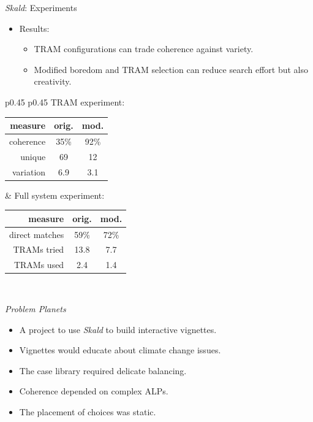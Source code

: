 \documentclass[xcolor=x11names]{beamer}
\def\skald/{\textit{Skald}}
\def\problemplanets/{\textit{Problem Planets}}
\begin{document}
\begin{frame}{\skald/: Experiments}
  \begin{itemize}\addtolength{\itemsep}{0.5\baselineskip}
    \item Results:
    \begin{itemize}\addtolength{\itemsep}{0.5\baselineskip}
      \vspace{0.5\baselineskip}
      \item TRAM configurations can trade coherence against variety.
      \item Modified boredom and TRAM selection can reduce search effort but also creativity.
    \end{itemize}
  \end{itemize}
  \vspace{1ex}
  \begin{tabular}{p{} p{}}
  \scriptsize
  \centering
  TRAM experiment: \newline
  \begin{tabular}{r c c}
      \toprule
      measure & orig. & mod. \\
      \midrule
      coherence & 35\% & 92\%  \\
      unique & 69 & 12 \\
      variation & 6.9 & 3.1  \\
      \bottomrule
  \end{tabular}
  &
  \scriptsize
  \centering
  Full system experiment: \newline
  \begin{tabular}{r c c}
      \toprule
      measure & orig. & mod. \\
      \midrule
      direct matches & 59\% & 72\% \\
      TRAMs tried & 13.8 & 7.7  \\
      TRAMs used & 2.4 & 1.4  \\
      \bottomrule
  \end{tabular} \newline
\end{tabular}
  \vfill
  \centering
  \tiny
   \\
\end{frame}

\begin{frame}{\problemplanets/}
  \begin{itemize}\addtolength{\itemsep}{0.5\baselineskip}
    \item A project to use \skald/ to build interactive vignettes.
    \item Vignettes would educate about climate change issues.
    \item The case library required delicate balancing.
    \item Coherence depended on complex ALPs.
    \item The placement of choices was static.
  \end{itemize}
\end{frame}
\end{document}
